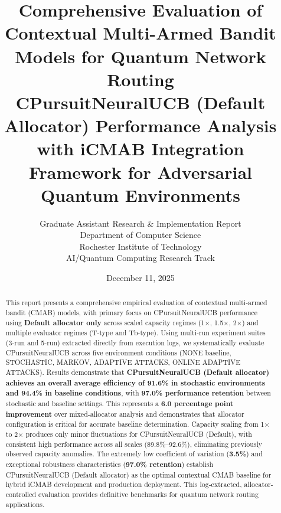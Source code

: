 \documentclass[12pt,a4paper]{article}
\title{\textbf{Comprehensive Evaluation of Contextual Multi-Armed Bandit Models for Quantum Network Routing}\\
\large{CPursuitNeuralUCB (Default Allocator) Performance Analysis with iCMAB Integration Framework for Adversarial Quantum Environments}}
\author{Graduate Assistant Research \& Implementation Report\\ 
Department of Computer Science \\ 
Rochester Institute of Technology \\ 
AI/Quantum Computing Research Track}
\date{December 11, 2025}
\newcommand{\critical}[1]{\textcolor{criticalcolor}{\textbf{#1}}}
\newcommand{\success}[1]{\textcolor{successcolor}{\textbf{#1}}}
\begin{document}
\maketitle

\begin{abstract}
This report presents a comprehensive empirical evaluation of contextual multi-armed bandit (CMAB) models, with primary focus on CPursuitNeuralUCB performance using \textbf{Default allocator only} across scaled capacity regimes (1$\times$, 1.5$\times$, 2$\times$) and multiple evaluator regimes (T-type and Tb-type). Using multi-run experiment suites (3-run and 5-run) extracted directly from execution logs, we systematically evaluate CPursuitNeuralUCB across five environment conditions (NONE baseline, STOCHASTIC, MARKOV, ADAPTIVE ATTACKS, ONLINE ADAPTIVE ATTACKS). Results demonstrate that \success{CPursuitNeuralUCB (Default allocator) achieves an overall average efficiency of 91.6\% in stochastic environments and 94.4\% in baseline conditions}, with \success{97.0\% performance retention} between stochastic and baseline settings. This represents a \critical{6.0 percentage point improvement} over mixed-allocator analysis and demonstrates that allocator configuration is critical for accurate baseline determination. Capacity scaling from 1$\times$ to 2$\times$ produces only minor fluctuations for CPursuitNeuralUCB (Default), with consistent high performance across all scales (89.8\%–92.6\%), eliminating previously observed capacity anomalies. The extremely low coefficient of variation (\success{3.5\%}) and exceptional robustness characteristics (\success{97.0\% retention}) establish CPursuitNeuralUCB (Default allocator) as the optimal contextual CMAB baseline for hybrid iCMAB development and production deployment. This log-extracted, allocator-controlled evaluation provides definitive benchmarks for quantum network routing applications.
\end{abstract}

\newpage
{\tableofcontents}

\newpage
\end{document}
